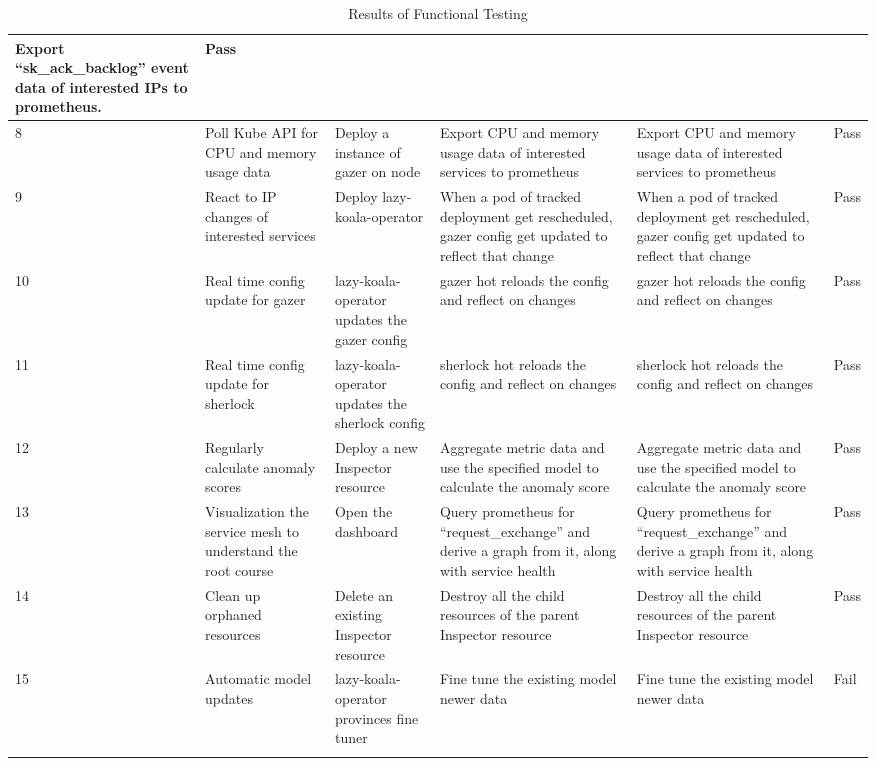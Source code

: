 \begin{longtable}{|p{3mm}|p{30mm}|p{27mm}|p{33mm}|p{33mm}|p{10mm}|}
      Export “sk\_ack\_backlog” event data of interested IPs to prometheus. &
      Pass \\ \hline
    8 &
      Poll Kube API for CPU and memory usage data &
      Deploy a instance of \ac{gazer} on node &
      Export CPU and memory usage data of interested services to prometheus &
      Export CPU and memory usage data of interested services to prometheus &
      Pass \\ \hline
    9 &
      React to IP changes of interested services &
      Deploy \ac{lazy-koala-operator} &
      When a pod of tracked deployment get rescheduled, gazer config get updated to reflect that change &
      When a pod of tracked deployment get rescheduled, gazer config get updated to reflect that change &
      Pass \\ \hline
    10 &
      Real time config update for \ac{gazer} &
      \ac{lazy-koala-operator} updates the \ac{gazer} config &
      \ac{gazer} hot reloads the config and reflect on changes &
      \ac{gazer} hot reloads the config and reflect on changes &
      Pass \\ \hline
    11 &
      Real time config update for \ac{sherlock} &
      \ac{lazy-koala-operator} updates the \ac{sherlock} config &
      \ac{sherlock} hot reloads the config and reflect on changes &
      \ac{sherlock} hot reloads the config and reflect on changes &
      Pass \\ \hline
    12 &
      Regularly calculate anomaly scores &
      Deploy a new Inspector resource &
      Aggregate metric data and use the specified model to calculate the anomaly score &
      Aggregate metric data and use the specified model to calculate the anomaly score &
      Pass \\ \hline
    13 &
      Visualization the service mesh to understand the root course &
      Open the dashboard &
      Query prometheus for “request\_exchange” and derive a graph from it, along with service health &
      Query prometheus for “request\_exchange” and derive a graph from it, along with service health &
      Pass \\ \hline
    14 &
      Clean up orphaned resources &
      Delete an existing Inspector resource &
      Destroy all the child resources of the parent Inspector resource &
      Destroy all the child resources of the parent Inspector resource &
      Pass \\ \hline
    15 &
      Automatic model updates &
      \ac{lazy-koala-operator} provinces fine tuner &
      Fine tune the existing model newer data &
      Fine tune the existing model newer data &
      Fail \\ \hline

      \caption{Results of Functional Testing}
\end{longtable}